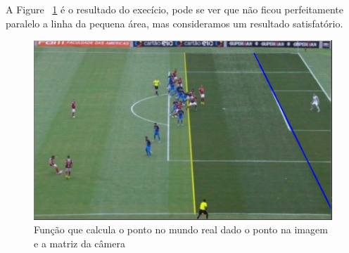 \documentclass{article}
\begin{document}
    A Figure ~\ref{fig:result2} é o resultado do execício, pode se ver que não ficou perfeitamente paralelo a linha da pequena área, mas consideramos um resultado satisfatório.
        \begin{figure}[h!]
        \includegraphics[scale=0.5]{result2.PNG}
        \caption{Função que calcula o ponto no mundo real dado o ponto na imagem e a matriz da câmera}
        \label{fig:result2}
        \end{figure}
\end{document}
